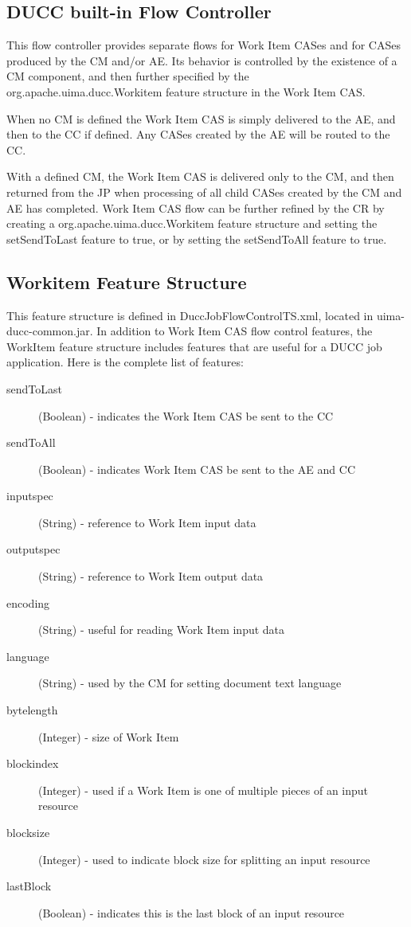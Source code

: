 \subsection{DUCC built-in Flow Controller}
This flow controller provides separate flows for Work Item CASes and for CASes produced by the CM and/or AE.
Its behavior is controlled by the existence of a CM component, and then further specified by the
org.apache.uima.ducc.Workitem feature structure in the Work Item CAS.

When no CM is defined the Work Item CAS is simply delivered to the AE, and then to the CC if defined. 
Any CASes created by the AE will be routed to the CC.

With a defined CM, the Work Item CAS is delivered only to the CM, and then returned from the JP when processing
of all child CASes created by the CM and AE has completed. Work Item CAS flow can be further refined by the CR by
creating a org.apache.uima.ducc.Workitem feature structure and setting the setSendToLast feature to true,
or by setting the setSendToAll feature to true.

\subsection{Workitem Feature Structure}
This feature structure is defined in DuccJobFlowControlTS.xml, located in uima-ducc-common.jar.
In addition to Work Item CAS flow control features, the WorkItem feature structure includes features that are useful
for a DUCC job application. Here is the complete list of features:

\begin{description}
  \item[sendToLast] (Boolean) - indicates the Work Item CAS be sent to the CC
  \item[sendToAll] (Boolean) - indicates Work Item CAS be sent to the AE and CC
  \item[inputspec] (String) - reference to Work Item input data
  \item[outputspec] (String) - reference to Work Item output data
  \item[encoding] (String) - useful for reading Work Item input data
  \item[language] (String) - used by the CM for setting document text language
  \item[bytelength] (Integer) - size of Work Item
  \item[blockindex] (Integer) - used if a Work Item is one of multiple pieces of an input resource
  \item[blocksize] (Integer) - used to indicate block size for splitting an input resource
  \item[lastBlock] (Boolean) - indicates this is the last block of an input resource
\end{description}

